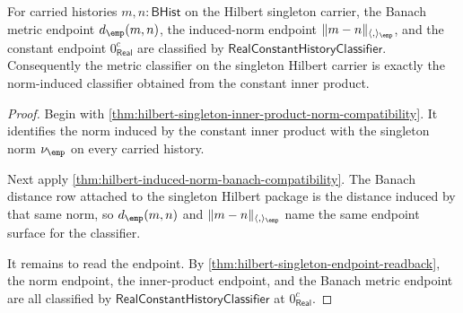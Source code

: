 \begin{theorem}
\label{thm:hilbert-singleton-norm-induced-metric-classifier}
For carried histories $m,n:\mathsf{BHist}$ on the Hilbert singleton carrier,
the Banach metric endpoint $d_{\emp}(m,n)$, the induced-norm endpoint
$\|m-n\|_{\langle,\rangle_{\emp}}$, and the constant endpoint
$0_{\mathsf{Real}}^{c}$ are classified by
$\mathsf{RealConstantHistoryClassifier}$. Consequently the metric classifier
on the singleton Hilbert carrier is exactly the norm-induced classifier
obtained from the constant inner product.
\end{theorem}
\begin{proof}
Begin with
\autoref{thm:hilbert-singleton-inner-product-norm-compatibility}. It identifies
the norm induced by the constant inner product with the singleton norm
$\nu_{\emp}$ on every carried history.

Next apply
\autoref{thm:hilbert-induced-norm-banach-compatibility}. The Banach distance
row attached to the singleton Hilbert package is the distance induced by that
same norm, so $d_{\emp}(m,n)$ and
$\|m-n\|_{\langle,\rangle_{\emp}}$ name the same endpoint surface for the
classifier.

It remains to read the endpoint. By
\autoref{thm:hilbert-singleton-endpoint-readback}, the norm endpoint, the
inner-product endpoint, and the Banach metric endpoint are all classified by
$\mathsf{RealConstantHistoryClassifier}$ at $0_{\mathsf{Real}}^{c}$.
\end{proof}

